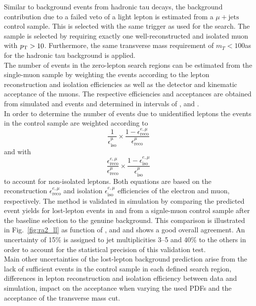 Similar to background events from hadronic tau decays, the background contribution due to a failed veto of a light lepton is estimated from a $\mu + \mathrm{jets}$ control sample. This is selected with the same trigger as used for the search. The sample is selected by requiring exactly one well-reconstructed and isolated muon with $p_{\text{T}} > 10$\gev. Furthermore, the same transverse mass requirement of $m_T < 100$\gev as for the hadronic tau background is applied. \\ 
The number of events in the zero-lepton search regions can be estimated from the single-muon sample by weighting the events according to the lepton reconstruction and isolation efficiencies as well as the detector and kinematic acceptance of the muons. The respective efficiencies and acceptances are obtained from simulated \ttbar and \WJets events and determined in intervals of \HT, \MHT and \NJets. \\
In order to determine the number of events due to unidentified leptons the events in the control sample are weighted according to
\begin{equation*}
\frac{1}{\epsilon_\mathrm{iso}^\mathrm{\mu}} \times \frac{1-\epsilon_\mathrm{reco}^{e, \mu}}{\epsilon_\mathrm{reco}^{\mu}}
\end{equation*}
and with
\begin{equation*}
\frac{\epsilon_\mathrm{reco}^{e, \mu}}{\epsilon_\mathrm{reco}^{\mu}} \times \frac{1-\epsilon_\mathrm{iso}^{e, \mu}}{\epsilon_\mathrm{iso}^{\mu}}
\end{equation*}
to account for non-isolated leptons. Both equations are based on the reconstruction $\epsilon_\mathrm{reco}^{e, \mu}$ and isolation $\epsilon_\mathrm{iso}^{e, \mu}$ efficiencies of the electron and muon, respectively. 
The method is validated in simulation by comparing the predicted event yields for lost-lepton events in \ttbar and \WJets from a signle-muon control sample after the baseline selection to the genuine background. This comparison is illustrated in Fig.~\ref{fig:ra2_ll} as function of \HT, \MHT and \NJets and shows a good overall agreement. An uncertainty of 15\% is assigned to jet multiplicities 3--5 and 40\% to the others in order to account for the statistical precision of this validation test.\\
Main other uncertainties of the lost-lepton background prediction arise from the lack of sufficient events in the control sample in each defined search region, differences in lepton reconstruction and isolation efficiency between data and simulation, impact on the acceptance when varying the used PDFs and the acceptance of the transverse mass cut.

